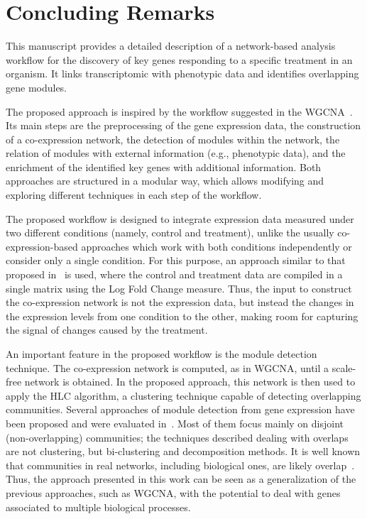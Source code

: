 \section*{Concluding Remarks}
\label{sec.concl}

This manuscript provides a detailed description of a network-based
analysis workflow for the discovery of key genes responding to a
specific treatment in an organism. It links transcriptomic with
phenotypic data and identifies overlapping gene modules.
\vspace{0.5cm}

The proposed approach is inspired by the workflow suggested in the
WGCNA~\cite{langfelder2008wgcna}. Its main steps are the preprocessing
of the gene expression data, the construction of a co-expression
network, the detection of modules within the network, the relation of
modules with external information (e.g., phenotypic data), and the
enrichment of the identified key genes with additional information.
Both approaches are structured in a modular way, which allows
modifying and exploring different techniques in each step of the
workflow.
\vspace{0.5cm}

The proposed workflow is designed to integrate expression data
measured under two different conditions (namely, control and
treatment), unlike the usually co-expression-based approaches which
work with both conditions independently or consider only a single
condition. For this purpose, an approach similar to that proposed
in~\cite{du2019network} is used, where the control and treatment data
are compiled in a single matrix using the Log Fold Change
measure. Thus, the input to construct the co-expression network is not
the expression data, but instead the changes in the expression levels
from one condition to the other, making room for capturing the signal
of changes caused by the treatment.
\vspace{0.5cm}

An important feature in the proposed workflow is the module
detection technique. The co-expression network is computed, as in
WGCNA, until a scale-free network is obtained. In the proposed
approach, this network is then used to apply the HLC algorithm, a
clustering technique capable of detecting overlapping
communities. Several approaches of module detection from gene
expression have been proposed and were evaluated
in~\cite{saelens2018comprehensive}. Most of them focus mainly on
disjoint (non-overlapping) communities; the techniques described
dealing with overlaps are not clustering, but bi-clustering and
decomposition methods. It is well known that communities in real
networks, including biological ones, are likely
overlap~\cite{palla2005uncovering}. Thus, the approach presented
in this work can be seen as a generalization of the previous
approaches, such as WGCNA, with the potential to deal with genes
associated to multiple biological processes.
\vspace{0.5cm}

